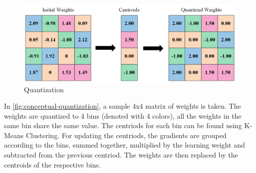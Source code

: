 \documentclass{ioereport}
\begin{document}
    \begin{figure}[H]
            \centering
            \includegraphics[width=\linewidth]{assets/conceptual figure of quantization.png}
            \caption{Quantization}
            \label{fig:conceptual-quantization}
    \end{figure}
    In \autoref{fig:conceptual-quantization}, a sample 4x4 matrix of weights is taken. The weights are quantized to 4 bins (denoted with 4 colors),
    all the weights in the same bin share the same value. The centriods for each bin can be found using K-Means Clustering. For updating the centriods, the gradients  are grouped according to the bins, summed together, multiplied by the learning weight and subtracted from the previous centriod. The weights are then replaced by the centroids of the respective bins.
        
\end{document}
